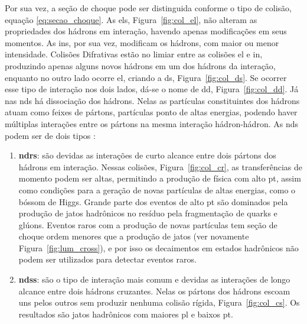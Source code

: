 Por sua vez, a seção de choque pode ser distinguida conforme o tipo de colisão,
equação \ref{eq:secao_choque}. As \glspl{el}, Figura~\ref{fig:col_el},
não alteram as propriedades dos hádrons em interação, havendo apenas 
modificações em seus momentos. As
\glspl{in}, por sua vez, modificam os hádrons, com maior ou menor intensidade. 
Colisões Difrativas estão no limiar entre as colisões \gls{el} e \acrshort{in},
produzindo apenas alguns novos hádrons em um dos hádrons da interação, enquanto no outro
lado ocorre \gls{el}, criando a \gls{ds}, Figura~\ref{fig:col_ds}. 
Se ocorrer esse tipo de interação nos dois lados, dá-se o nome de \gls{dd},
Figura~\ref{fig:col_dd}. Já nas \glspl{nd}
há dissociação dos hádrons. Nelas as partículas constituintes dos
hádrons atuam como feixes de pártons, partículas ponto de altas energias, podendo haver
múltiplas interações entre os pártons na mesma interação hádron-hádron. 
As \glspl{nd} podem ser de dois tipos \cite{THESIS_LAR,Underlying}:
\begin{enumerate}
\item \textbf{\glspl{ndr}}:
são devidas as interações de curto alcance entre dois pártons dos hádrons em
interação. Nessas colisões, Figura~\ref{fig:col_cr}, as transferências de momento podem ser altas,
permitindo a produção de física com alto \gls{pt}, 
assim como condições para a geração de novas partículas de altas
energias, como o bóssom de Higgs. Grande parte dos eventos de alto \gls{pt} são
dominados pela produção de jatos hadrônicos no resíduo pela fragmentação de
quarks e glúons. Eventos raros com a produção de novas partículas tem seção de
choque ordem menores que a produção de jatos (ver novamente
Figura~\ref{fig:lum_cross}), e por isso os decaimentos em
estados hadrônicos não podem ser utilizados para detectar eventos raros. 
\item \textbf{\glspl{nds}}: 
são o tipo de interação mais comum e devidas as interações de longo alcance entre
dois hádrons cruzantes. Nelas os pártons dos hádrons escoam uns pelos outros sem produzir
nenhuma colisão rígida, Figura~\ref{fig:col_cs}. Os resultados são jatos
hadrônicos com maiores \gls{pl} e baixos \gls{pt}.
\end{enumerate}


